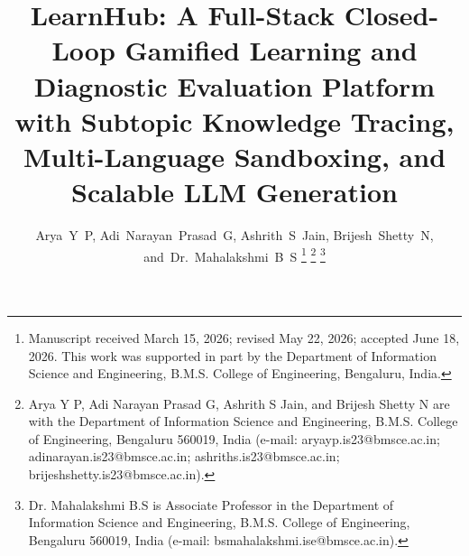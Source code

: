 \documentclass[journal]{IEEEtran}
\begin{document}
\title{LearnHub: A Full-Stack Closed-Loop Gamified Learning and Diagnostic Evaluation Platform with Subtopic Knowledge Tracing, Multi-Language Sandboxing, and Scalable LLM Generation}
\author{Arya~Y~P,
Adi~Narayan~Prasad~G,
Ashrith~S~Jain,
Brijesh~Shetty~N,
and~Dr.~Mahalakshmi~B~S%
\thanks{Manuscript received March 15, 2026; revised May 22, 2026; accepted June 18, 2026. This work was supported in part by the Department of Information Science and Engineering, B.M.S. College of Engineering, Bengaluru, India.}%
\thanks{Arya Y P, Adi Narayan Prasad G, Ashrith S Jain, and Brijesh Shetty N are with the Department of Information Science and Engineering, B.M.S. College of Engineering, Bengaluru 560019, India (e-mail: aryayp.is23@bmsce.ac.in; adinarayan.is23@bmsce.ac.in; ashriths.is23@bmsce.ac.in; brijeshshetty.is23@bmsce.ac.in).}%
\thanks{Dr. Mahalakshmi B.S is Associate Professor in the Department of Information Science and Engineering, B.M.S. College of Engineering, Bengaluru 560019, India (e-mail: bsmahalakshmi.ise@bmsce.ac.in).}%
}
\maketitle
\end{document}
